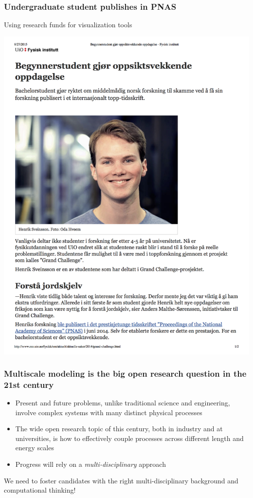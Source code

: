 \documentclass{beamer}
\begin{document}
\begin{frame}
\frametitle{Undergraduate student publishes in PNAS}

\begin{block}{Using research funds for visualization tools }


\centerline{\includegraphics[width=0.7\linewidth]{fig-future/pnas.png}}



\end{block}
\end{frame}

\begin{frame}
\frametitle{Multiscale modeling is the big open research question in the 21st century}

\begin{block}{}
\begin{itemize}
\item Present and future problems, unlike traditional
  science and engineering, involve complex systems with many distinct
  physical processes

\item The wide open research topic of this century, both in industry and at universities, is how to effectively couple processes across different length and energy scales

\item Progress will rely on a \emph{multi-disciplinary} approach
\end{itemize}

\noindent
\end{block}

\begin{block}{}
We need to foster candidates with the right
multi-disciplinary background and computational thinking!
\end{block}
\end{frame}
\end{document}
